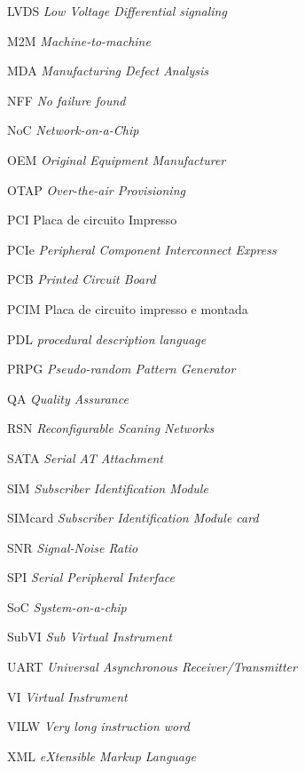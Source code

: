 \begin{siglas}
    \item [LVDS] \textit{Low Voltage Differential signaling}
    \item [M2M] \textit{Machine-to-machine}
    \item [MDA] \textit{Manufacturing Defect Analysis}
    \item [NFF] \textit{No failure found}
    \item [NoC] \textit{Network-on-a-Chip}
    \item [OEM] \textit{Original Equipment Manufacturer}
    \item [OTAP] \textit{Over-the-air Provisioning}
    \item [PCI] Placa de circuito Impresso
    \item [PCIe] \textit{Peripheral Component Interconnect Express}
    \item [PCB] \textit{Printed Circuit Board}
    \item [PCIM] Placa de circuito impresso e montada
    \item [PDL] \textit{procedural description language}
    \item [PRPG] \textit{Pseudo-random Pattern Generator}
    \item [QA] \textit{Quality Assurance}
    \item [RSN] \textit{Reconfigurable Scaning Networks}
    \item [SATA] \textit{Serial AT Attachment}
    \item [SIM] \textit{Subscriber Identification Module}
    \item [SIMcard] \textit{Subscriber Identification Module card}
    \item [SNR] \textit{Signal-Noise Ratio}
    \item [SPI] \textit{Serial Peripheral Interface}
    \item [SoC] \textit{System-on-a-chip}
    \item [SubVI] \textit{Sub Virtual Instrument}
    \item [UART] \textit{Universal Asynchronous Receiver/Transmitter}
    \item [VI] \textit{Virtual Instrument}
    \item [VILW] \textit{Very long instruction word}
    \item [XML] \textit{eXtensible Markup Language}
    
    
\end{siglas}


\tableofcontents*
\cleardoublepage


\textual
